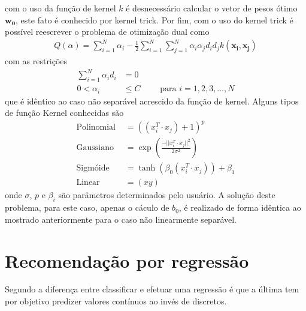com o uso da função de kernel \(k\) é desnecessário calcular o vetor de pesos ótimo \(\mathbf{w_{0}}\), este fato é conhecido por kernel trick. Por fim, com o uso do kernel trick é possível reescrever o problema de otimização dual como
\begin{align}
Q(\alpha) = \sum\limits_{i=1}^{N} \alpha_{i} - \frac{1}{2} \sum\limits_{i=1}^{N} \sum\limits_{j=1}^{N} \alpha_{i}\alpha_{j}d_{i}d_{j} k(\mathbf{x_{i}}, \mathbf{x_{j}})
\end{align}
com as restrições
\begin{align}
\sum\limits_{i=1}^{N} \alpha_{i}d_{i} &= 0 \\
0 < \alpha_{i} &\leq C	\qquad \textrm{ para } i = 1, 2, 3, \ldots, N
\end{align}
que é idêntico ao caso não separável acrescido da função de kernel. Alguns tipos de função Kernel conhecidas \cite{Haykin2007} são
\begin{align}
\textrm{Polinomial } &= ((x_{i}^{T} \cdot x_{j})+1)^{p}								\\
\textrm{Gaussiano }  &= \exp(\frac{-||x_{i}^{T} \cdot x_{j}||^{2}}{2\sigma^{2}})	\\
\textrm{Sigmóide }   &= \tanh(\beta_{0} (x_{i}^{T} \cdot x_{j})) +  \beta_{1} 		\\
\textrm{Linear }   &= (xy)
\end{align}
onde \(\sigma\), \(p\) e \(\beta_{i}\) são parâmetros determinados pelo usuário. A solução deste problema, para este caso, apenas o cáculo de \(b_{0}\), é realizado de forma idêntica ao mostrado anteriormente para o caso não linearmente separável.

\section{Recomendação por regressão}\label{SEC_RECOMENDACAO_REGRESSAO}
Segundo  a diferença entre classificar e efetuar uma regressão é que a última tem por objetivo predizer valores contínuos ao invés de discretos.

